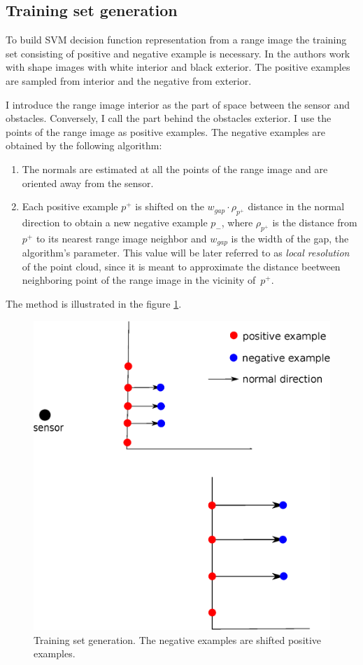 \subsection{Training set generation}

To build SVM decision function representation from a range image the training set consisting of positive and negative example is necessary. In \cite{SVS2013} the authors work with shape images with white interior and black exterior. The positive examples are sampled from interior and the negative from exterior.

I introduce the range image interior as the part of space between the sensor and obstacles. Conversely, I call the part behind the obstacles exterior. I use the points of the range image as positive examples. The negative examples are obtained by the following algorithm:
\begin{enumerate}
\item
The normals are estimated at all the points of the range image and are oriented away from the sensor.
\item
Each positive example $p^+$ is shifted on the $w_{gap} \cdot \rho_{p^+}$ distance in the normal direction to obtain a new negative example $p_{-}$, where $\rho_{p^+}$ is the distance from $p^+$ to its nearest range image neighbor and $w_{gap}$ is the width of the gap, the algorithm's parameter. This value will be later referred to as \textit{local resolution} of the point cloud, since it is meant to approximate the distance beetween neighboring point of the range image in the vicinity of~$p^+$.
\end{enumerate}
The method is illustrated in the figure \ref{tset}.
\begin{figure}
\centering
\includegraphics[scale=0.5]{training_set.eps}
\caption{Training set generation. The negative examples are shifted positive examples.}
\label{tset}
\end{figure}

